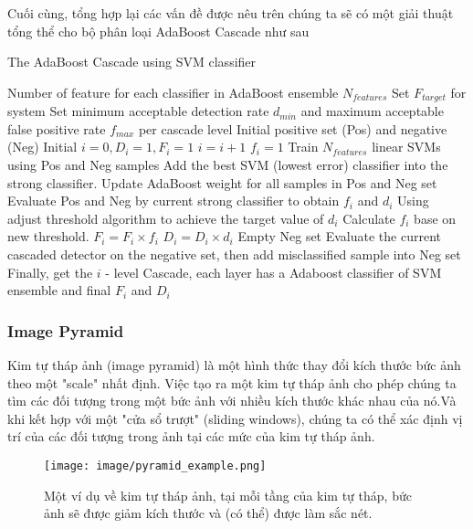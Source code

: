 \documentclass[12pt,a4paper]{article}
\begin{document}
Cuối cùng, tổng hợp lại các vấn đề được nêu trên chúng ta sẽ có một giải thuật tổng thể cho bộ phân loại AdaBoost Cascade như sau
\begin{algorithm}[H]
\caption{The AdaBoost Cascade using SVM classifier}
\begin{algorithmic}[1]
\REQUIRE Number of feature for each classifier in AdaBoost ensemble $N_{features}$
\STATE Set $F_{target}$ for system
\STATE Set minimum acceptable detection rate $d_{min}$ and maximum acceptable false positive rate $f_{max}$ per cascade level
\STATE Initial positive set (Pos) and negative (Neg)
\STATE Initial $ i = 0, D_i = 1, F_i = 1$
\STATE $ i = i + 1$
\STATE $ f_i = 1$
\STATE Train $N_{features}$ linear SVMs using Pos and Neg samples
\STATE Add the best SVM (lowest error) classifier into the strong classifier.
\STATE Update AdaBoost weight for all samples in Pos and Neg set
\STATE Evaluate Pos and Neg by current strong classifier to obtain $f_i$ and $d_i$
\STATE Using adjust threshold algorithm to achieve the target value of $d_i$
\STATE Calculate $f_i$ base on new threshold.
\ENDWHILE
\STATE $F_i = F_i \times f_i$
\STATE $D_i = D_i \times d_i$
\STATE Empty Neg set
\STATE Evaluate the current cascaded detector on the negative set, then add misclassified sample into Neg set
\ENDWHILE
\STATE Finally, get the $i$ - level Cascade, each layer has a Adaboost classifier of SVM  ensemble and final $F_i$ and $D_i$
\end{algorithmic}
\end{algorithm}
\subsubsection{Image Pyramid \cite{pyramid}}
Kim tự tháp ảnh (image pyramid) là một hình thức thay đổi kích thước bức ảnh theo một "scale" nhất định. Việc tạo ra một kim tự tháp ảnh cho phép chúng ta tìm các đối tượng trong một bức ảnh với nhiều kích thước khác nhau của nó.Và khi kết hợp với một "cửa sổ trượt" (sliding windows), chúng ta có thể xác định vị trí của các đối tượng trong ảnh tại các mức của kim tự tháp ảnh.

                \begin{figure}[H]
                    \centering
                    \texttt{[image: image/pyramid\_example.png]}
                    \caption{Một ví dụ về kim tự tháp ảnh, tại mỗi tầng của kim tự tháp, bức ảnh sẽ được giảm kích thước và (có thể) được làm sắc nét.}
                    \label{fig:my_label}
                \end{figure}
\end{document}
